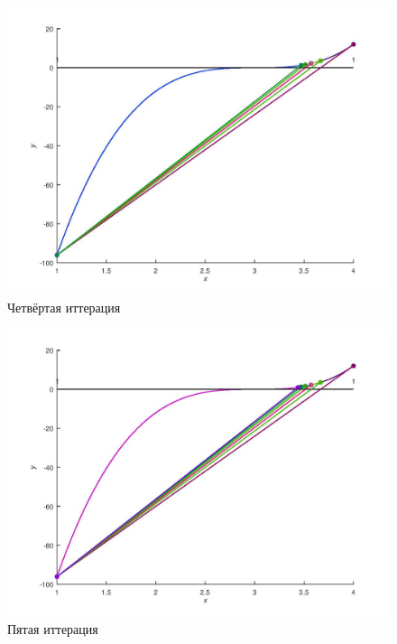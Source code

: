 \documentclass[a4paper,12pt]{article}
\begin{document}
    \begin{figure}[H]
        \centering
        \includegraphics[scale=0.4]{4secantitter.jpg}
        \caption{Четвёртая иттерация}
    \end{figure}
    \begin{figure}[H]
        \centering
        \includegraphics[scale=0.4]{5secantitter.jpg}
        \caption{Пятая иттерация}
    \end{figure}
\end{document}
